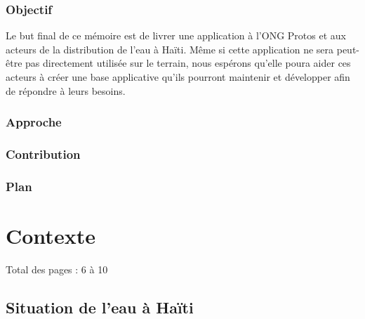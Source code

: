\documentclass{eplmastersthesis_FR}
\begin{document}
		\subsection*{Objectif}

			Le but final de ce mémoire est de livrer une application à l'ONG Protos et aux acteurs de la distribution de l'eau à Haïti. Même si cette application ne sera peut-être pas directement utilisée sur le terrain, nous espérons qu'elle poura aider ces acteurs à créer une base applicative qu'ils pourront maintenir et développer afin de répondre à leurs besoins.


		\subsection*{Approche}
		\subsection*{Contribution}
		\subsection*{Plan}

	\chapter{Contexte}

		Total des pages : 6 à 10

		\section{Situation de l'eau à Haïti}
\end{document}

